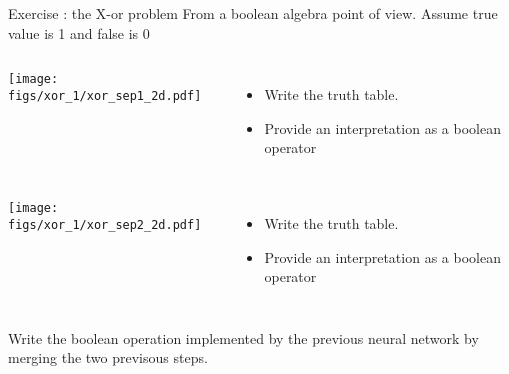 \newcommand{\cone}{\color{green!30!black}}
\newcommand{\czero}{\color{red!30!black}}
\begin{frame}{Exercise : the X-or problem}
  From a boolean algebra point of view. Assume {\cone true value is 1} and {\czero false is 0}
  \begin{columns}
    \begin{center}
      \texttt{[image: figs/xor\_1/xor\_sep1\_2d.pdf]}
    \end{center}
    \begin{itemize}
    \item Write the truth table. 
    \item Provide an interpretation as a boolean operator
    \end{itemize}    
  \end{columns}
  \begin{columns}
    \begin{center}
      \texttt{[image: figs/xor\_1/xor\_sep2\_2d.pdf]}
    \end{center}
        \begin{itemize}
        \item  Write the truth table. 
        \item Provide an interpretation as a boolean operator
    \end{itemize}    
  \end{columns}
  Write the boolean operation implemented by the previous neural network by merging the two previsous steps. 
\end{frame}